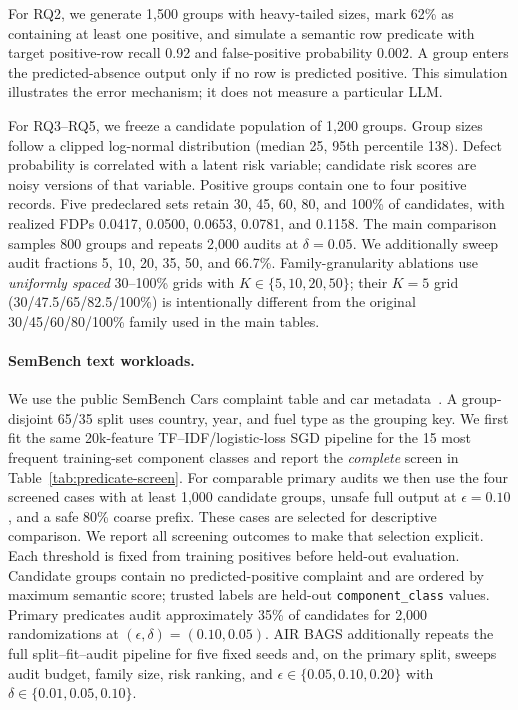 \documentclass[runningheads]{llncs}
\begin{document}
For RQ2, we generate 1,500 groups with heavy-tailed sizes, mark 62\% as containing at least one positive, and simulate a semantic row predicate with target positive-row recall 0.92 and false-positive probability 0.002. A group enters the predicted-absence output only if no row is predicted positive. This simulation illustrates the error mechanism; it does not measure a particular LLM.

For RQ3--RQ5, we freeze a candidate population of 1,200 groups. Group sizes follow a clipped log-normal distribution (median 25, 95th percentile 138). Defect probability is correlated with a latent risk variable; candidate risk scores are noisy versions of that variable. Positive groups contain one to four positive records. Five predeclared sets retain 30, 45, 60, 80, and 100\% of candidates, with realized FDPs 0.0417, 0.0500, 0.0653, 0.0781, and 0.1158. The main comparison samples 800 groups and repeats 2,000 audits at $\delta=0.05$. We additionally sweep audit fractions 5, 10, 20, 35, 50, and 66.7\%. Family-granularity ablations use \emph{uniformly spaced} 30--100\% grids with $K\in\{5,10,20,50\}$; their $K=5$ grid (30/47.5/65/82.5/100\%) is intentionally different from the original 30/45/60/80/100\% family used in the main tables.

\paragraph{SemBench text workloads.} We use the public SemBench Cars complaint table and car metadata~\cite{sembench_repo}. A group-disjoint 65/35 split uses country, year, and fuel type as the grouping key. We first fit the same 20k-feature TF--IDF/logistic-loss SGD pipeline for the 15 most frequent training-set component classes and report the \emph{complete} screen in Table~\ref{tab:predicate-screen}. For comparable primary audits we then use the four screened cases with at least 1,000 candidate groups, unsafe full output at $\epsilon=0.10$, and a safe 80\% coarse prefix. These cases are selected for descriptive comparison. We report all screening outcomes to make that selection explicit. Each threshold is fixed from training positives before held-out evaluation. Candidate groups contain no predicted-positive complaint and are ordered by maximum semantic score; trusted labels are held-out \texttt{component\_class} values. Primary predicates audit approximately 35\% of candidates for 2,000 randomizations at $(\epsilon,\delta)=(0.10,0.05)$. AIR BAGS additionally repeats the full split--fit--audit pipeline for five fixed seeds and, on the primary split, sweeps audit budget, family size, risk ranking, and $\epsilon\in\{0.05,0.10,0.20\}$ with $\delta\in\{0.01,0.05,0.10\}$.
\end{document}
